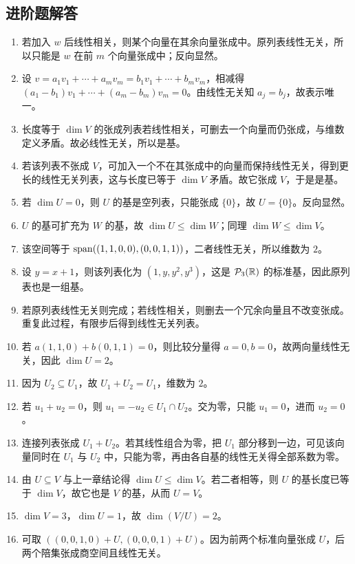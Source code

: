 \subsection*{进阶题解答}

\begin{enumerate}[label=\textbf{\medium\ \arabic*.}, leftmargin=3em]
\item 若加入 $w$ 后线性相关，则某个向量在其余向量张成中。原列表线性无关，所以只能是 $w$ 在前 $m$ 个向量张成中；反向显然。
\item 设 $v=a_1v_1+\cdots+a_mv_m=b_1v_1+\cdots+b_mv_m$，相减得 $(a_1-b_1)v_1+\cdots+(a_m-b_m)v_m=0$。由线性无关知 $a_j=b_j$，故表示唯一。
\item 长度等于 $\dim V$ 的张成列表若线性相关，可删去一个向量而仍张成，与维数定义矛盾。故必线性无关，所以是基。
\item 若该列表不张成 $V$，可加入一个不在其张成中的向量而保持线性无关，得到更长的线性无关列表，这与长度已等于 $\dim V$ 矛盾。故它张成 $V$，于是是基。
\item 若 $\dim U=0$，则 $U$ 的基是空列表，只能张成 $\{0\}$，故 $U=\{0\}$。反向显然。
\item $U$ 的基可扩充为 $W$ 的基，故 $\dim U\le\dim W$；同理 $\dim W\le\dim V$。
\item 该空间等于 $\operatorname{span}((1,1,0,0),(0,0,1,1))$，二者线性无关，所以维数为 $2$。
\item 设 $y=x+1$，则该列表化为 $(1,y,y^2,y^3)$，这是 $\mathcal{P}_3(\mathbb{R})$ 的标准基，因此原列表也是一组基。
\item 若原列表线性无关则完成；若线性相关，则删去一个冗余向量且不改变张成。重复此过程，有限步后得到线性无关列表。
\item 若 $a(1,1,0)+b(0,1,1)=0$，则比较分量得 $a=0,b=0$，故两向量线性无关，因此 $\dim U=2$。
\item 因为 $U_2\subseteq U_1$，故 $U_1+U_2=U_1$，维数为 $2$。
\item 若 $u_1+u_2=0$，则 $u_1=-u_2\in U_1\cap U_2$。交为零，只能 $u_1=0$，进而 $u_2=0$。
\item 连接列表张成 $U_1+U_2$。若其线性组合为零，把 $U_1$ 部分移到一边，可见该向量同时在 $U_1$ 与 $U_2$ 中，只能为零，再由各自基的线性无关得全部系数为零。
\item 由 $U\subseteq V$ 与上一章结论得 $\dim U\le\dim V$。若二者相等，则 $U$ 的基长度已等于 $\dim V$，故它也是 $V$ 的基，从而 $U=V$。
\item $\dim V=3$，$\dim U=1$，故 $\dim(V/U)=2$。
\item 可取 $((0,0,1,0)+U,(0,0,0,1)+U)$。因为前两个标准向量张成 $U$，后两个陪集张成商空间且线性无关。

\end{enumerate}
